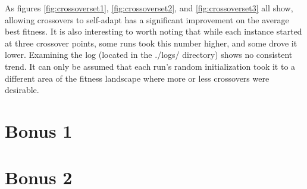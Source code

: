 \documentclass[11pt]{article}
\begin{document}
As figures \ref{fig:crossoverset1}, \ref{fig:crossoverset2}, and \ref{fig:crossoverset3} all show, allowing crossovers to self-adapt has a significant improvement on the average best fitness. It is also interesting to worth noting that while each instance started at three crossover points, some runs took this number higher, and some drove it lower. Examining the log (located in the ./logs/ directory) shows no consistent trend. It can only be assumed that each run's random initialization took it to a different area of the fitness landscape where more or less crossovers were desirable.


\section{Bonus 1}


\section{Bonus 2}
\end{document}
